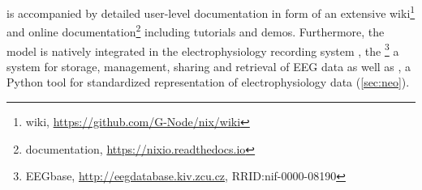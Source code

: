  is accompanied by detailed user-level documentation in form of an extensive wiki\footnote{ wiki, \url{https://github.com/G-Node/nix/wiki}} and online documentation\footnote{ documentation, \url{https://nixio.readthedocs.io}} including tutorials and demos. Furthermore, the  model is natively integrated in the electrophysiology recording system , the \footnote{EEGbase, \url{http://eegdatabase.kiv.zcu.cz}, RRID:nif-0000-08190} a system for storage, management, sharing and retrieval of EEG data as well as , a Python tool for standardized representation of electrophysiology data (\cref{sec:neo}).







